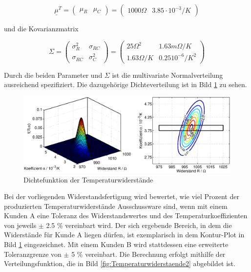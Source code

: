 \begin{equation}\label{eq:eighteightyseven}
\underline{\mu}^{T} =\left(\begin{array}{cc} {\mu _{R}} & {\mu _{C}} \end{array}\right)=\left(\begin{array}{cc} {1000 \Omega} & {3.85\cdot 10^{-3} /K} \end{array}\right)
\end{equation}

\noindent und die Kovarianzmatrix

\begin{equation}\label{eq:eighteightyeight}
\Sigma =\left(\begin{array}{cc} {\sigma _{R}^{2}} & {\sigma _{RC}} \\ {\sigma _{RC}} & {\sigma _{C}^{2}} \end{array}\right)=\left(\begin{array}{cc} {25 \Omega ^{2}} & {1.63 m\Omega /K} \\ {1.63 \Omega /K} & {0.25 10^{-6} /K^{2}} \end{array}\right)
\end{equation}

\noindent Durch die beiden Parameter \underbar{$\mu$} und \textbf{$\Sigma$} ist die multivariate Normalverteilung ausreichend spezifiziert. Die dazugeh\"{o}rige Dichteverteilung ist in Bild \ref{fig:Temperaturwiderstaende1} zu sehen.

\noindent 
\begin{figure}[H]
  \centerline{\includegraphics[width=1\textwidth]{Kapitel8/Bilder/image17}}
  \caption{Dichtefunktion der Temperaturwiderst\"{a}nde}
  \label{fig:Temperaturwiderstaende1}
\end{figure}

\noindent Bei der vorliegenden Widerstandsfertigung wird bewertet, wie viel Prozent der produzierten Temperaturwiderst\"{a}nde Ausschussware sind, wenn mit einem Kunden A eine Toleranz des Widerstandswertes und des Temperaturkoeffizienten von jeweils $\mathrm{\pm}$ 2.5 \% vereinbart wird. Der sich ergebende Bereich, in dem die Widerst\"{a}nde f\"{u}r Kunde A liegen d\"{u}rfen, ist exemplarisch in dem Kontur-Plot in Bild \ref{fig:Temperaturwiderstaende1} eingezeichnet. Mit einem Kunden B wird stattdessen eine erweiterte Toleranzgrenze von $\mathrm{\pm}$ 5 \% vereinbart. Die Berechnung erfolgt mithilfe der Verteilungsfunktion, die in Bild \ref{fig:Temperaturwiderstaende2} abgebildet ist. 

